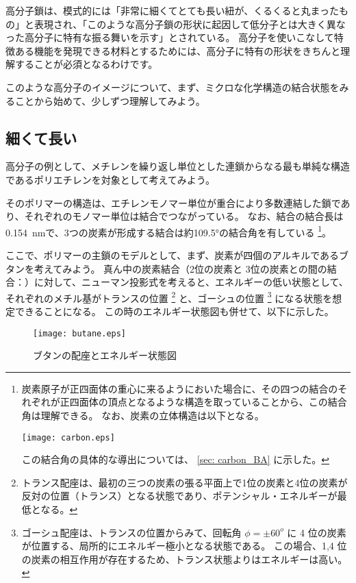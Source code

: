 \documentclass[a4paper,11pt]{jlreq}
\begin{document}
高分子鎖は、模式的には「非常に細くてとても長い紐が、くるくると丸まったもの」と表現され、「このような高分子鎖の形状に起因して低分子とは大きく異なった高分子に特有な振る舞いを示す」とされている。
高分子を使いこなして特徴ある機能を発現できる材料とするためには、高分子に特有の形状をきちんと理解することが必須となるわけです。

このような高分子のイメージについて、まず、ミクロな化学構造の結合状態をみることから始めて、少しずつ理解してみよう。

\subsection{細くて長い}

高分子の例として、メチレンを繰り返し単位とした連鎖からなる最も単純な構造であるポリエチレンを対象として考えてみよう。

そのポリマーの構造は、エチレンモノマー単位が重合により多数連結した鎖であり、それぞれのモノマー単位は結合でつながっている。
なお、結合の結合長は\qty{0.154}{nm}で、3つの炭素が形成する結合は約\ang{109.5}の結合角を有している
\footnote
{
炭素原子が正四面体の重心に来るようにおいた場合に、その四つの結合のそれぞれが正四面体の頂点となるような構造を取っていることから、この結合角は理解できる。
なお、炭素の立体構造は以下となる。
\begin{center}
	\texttt{[image: carbon.eps]}
\end{center}

この結合角の具体的な導出については、 \ref{sec: carbon_BA} に示した。
}。

ここで、ポリマーの主鎖のモデルとして、まず、炭素が四個のアルキルであるブタンを考えてみよう。
真ん中の炭素結合（2位の炭素と 3位の炭素との間の結合：）に対して、ニューマン投影式を考えると、エネルギーの低い状態として、それぞれのメチル基がトランスの位置
\footnote
{
トランス配座は、最初の三つの炭素の張る平面上で1位の炭素と4位の炭素が反対の位置（トランス）となる状態であり、ポテンシャル・エネルギーが最低となる。
}
と、ゴーシュの位置
\footnote
{
ゴーシュ配座は、トランスの位置からみて、回転角 $\phi = \pm 60^o$ に 4 位の炭素が位置する、局所的にエネルギー極小となる状態である。
この場合、1,4 位の炭素の相互作用が存在するため、トランス状態よりはエネルギーは高い。
}
になる状態を想定できることになる。
この時のエネルギー状態図も併せて、以下に示した。
\begin{figure}[htb]
 \centering
	\texttt{[image: butane.eps]}
	\caption{ブタンの配座とエネルギー状態図}
	\label{fig: butane}
\end{figure}
\end{document}
